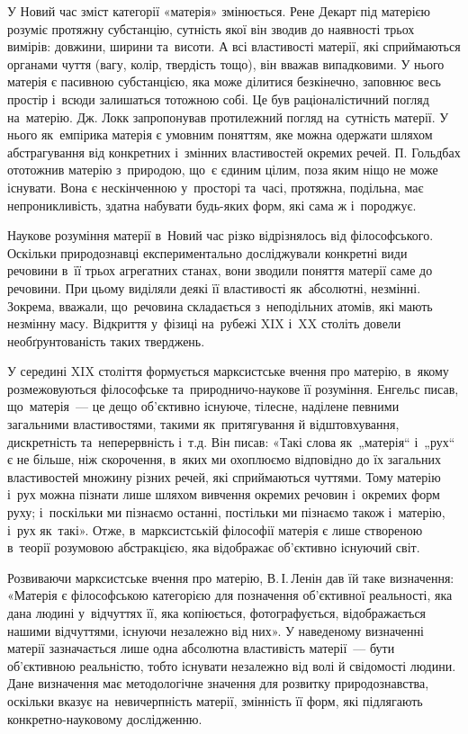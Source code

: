 \documentclass[a5paper,oneside,DIV=12,12pt,headings=small]{scrartcl}
\begin{document}
		У Новий час зміст категорії «матерія» змінюється. Рене Декарт під матерією розуміє протяжну субстанцію, сутність якої він зводив до наявності трьох вимірів: довжини, ширини та~висоти. А всі властивості матерії, які сприймаються органами чуття (вагу, колір, твердість тощо), він вважав випадковими. У нього матерія є пасивною субстанцією, яка може ділитися безкінечно, заповнює весь простір і~всюди залишаться тотожною собі. Це був раціоналістичний погляд на~матерію. Дж. Локк запропонував протилежний погляд на~сутність матерії. У нього як~емпірика матерія є умовним поняттям, яке можна одержати шляхом абстрагування від конкретних і~змінних властивостей окремих речей. П. Гольдбах ототожнив матерію з~природою, що~є єдиним цілим, поза яким ніщо не може існувати. Вона є нескінченною у~просторі та~часі, протяжна, подільна, має непроникливість, здатна набувати будь-яких форм, які сама ж і~породжує.
		
		Наукове розуміння матерії в~Новий час різко відрізнялось від філософського. Оскільки природознавці експериментально досліджували конкретні види речовини в~її трьох агрегатних станах, вони зводили поняття матерії саме до речовини. При цьому виділяли деякі її властивості як~абсолютні, незмінні. Зокрема, вважали, що~речовина складається з~неподільних атомів, які мають незмінну масу. Відкриття у~фізиці на~рубежі XIX і~XX століть довели необґрунтованість таких тверджень. 
		
		У середині XIX століття формується марксистське вчення про матерію, в~якому розмежовуються філософське та~при\-род\-ни\-чо-на\-у\-ко\-ве її розуміння. Енгельс писав, що~матерія~— це дещо об'\-єк\-тив\-но існуюче, тілесне, наділене певними загальними властивостями, такими як~притягування й відштовхування, дискретність та~неперервність і~т.д. Він писав: «Такі слова як~„матерія“ і~„рух“ є не більше, ніж скорочення, в~яких ми охоплюємо відповідно до їх загальних властивостей множину різних речей, які сприймаються чуттями. Тому матерію і~рух можна пізнати лише шляхом вивчення окремих речовин і~окремих форм руху; і~поскільки ми пізнаємо останні, постільки ми пізнаємо також і~матерію, і~рух як~такі». Отже, в~марксистській філософії матерія є лише створеною в~теорії розумовою абстракцією, яка відображає об'\-єк\-тив\-но існуючий світ.
		
		Розвиваючи марксистське вчення про матерію, В.\,І.\,Ленін дав їй таке визначення: «Матерія є філософською категорією для позначення об'\-єк\-тив\-ної реальності, яка дана людині у~відчуттях її, яка копіюється, фотографується, відображається нашими відчуттями, існуючи незалежно від них». У наведеному визначенні матерії зазначається лише одна абсолютна властивість матерії~— бути об'\-єк\-тив\-ною реальністю, тобто існувати незалежно від волі й свідомості людини. Дане визначення має методологічне значення для розвитку природознавства, оскільки вказує на~невичерпність матерії, змінність її форм, які підлягають конкретно-науковому дослідженню.
		
\end{document}

